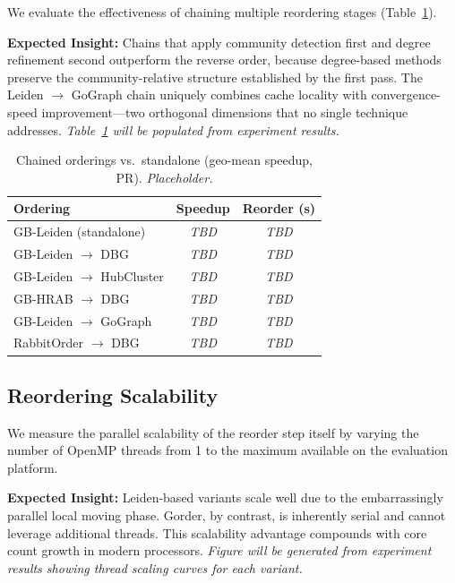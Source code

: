 \documentclass[sigconf, nonacm]{acmart}
\begin{document}
We evaluate the effectiveness of chaining multiple reordering stages (Table~\ref{table:chained}).

\textbf{Expected Insight:} Chains that apply community detection first and degree refinement second outperform the reverse order, because degree-based methods preserve the community-relative structure established by the first pass. The Leiden {\small$\to$} GoGraph chain uniquely combines cache locality with convergence-speed improvement---two orthogonal dimensions that no single technique addresses. \emph{Table~\ref{table:chained} will be populated from experiment results.}

\begin{table}[t]
\centering
\caption{Chained orderings vs.\ standalone (geo-mean speedup, PR). \emph{Placeholder.}}
\footnotesize
\begin{tabular}{@{}lcc@{}}
\toprule
\textbf{Ordering} & \textbf{Speedup} & \textbf{Reorder (s)} \\
\midrule
GB-Leiden (standalone)           & \emph{TBD} & \emph{TBD} \\
GB-Leiden {\small$\to$} DBG             & \emph{TBD} & \emph{TBD} \\
GB-Leiden {\small$\to$} HubCluster      & \emph{TBD} & \emph{TBD} \\
GB-HRAB {\small$\to$} DBG               & \emph{TBD} & \emph{TBD} \\
GB-Leiden {\small$\to$} GoGraph          & \emph{TBD} & \emph{TBD} \\
RabbitOrder {\small$\to$} DBG            & \emph{TBD} & \emph{TBD} \\
\bottomrule
\end{tabular}
\label{table:chained}
\end{table}

\subsection{Reordering Scalability}
\label{sec:scalability}

We measure the parallel scalability of the reorder step itself by varying the number of OpenMP threads from 1 to the maximum available on the evaluation platform.

\textbf{Expected Insight:} Leiden-based variants scale well due to the embarrassingly parallel local moving phase. Gorder, by contrast, is inherently serial and cannot leverage additional threads. This scalability advantage compounds with core count growth in modern processors. \emph{Figure will be generated from experiment results showing thread scaling curves for each variant.}
\end{document}
